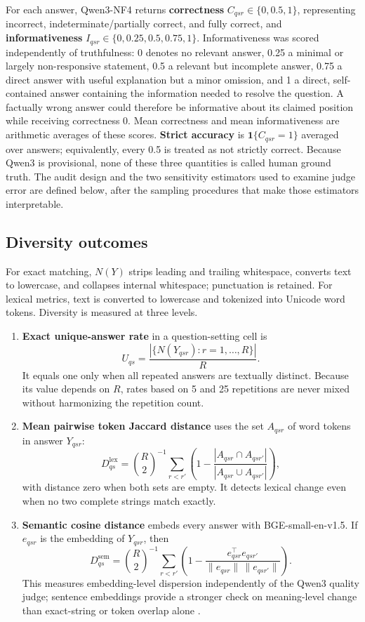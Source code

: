 \documentclass[11pt]{article}
\begin{document}
For each answer, Qwen3-NF4 returns \textbf{correctness}
$C_{qsr}\in\{0,0.5,1\}$, representing incorrect, indeterminate/partially
correct, and fully correct, and \textbf{informativeness}
$I_{qsr}\in\{0,0.25,0.5,0.75,1\}$. Informativeness was scored independently of
truthfulness: 0 denotes no relevant answer, 0.25 a minimal or largely
non-responsive statement, 0.5 a relevant but incomplete answer, 0.75 a direct
answer with useful explanation but a minor omission, and 1 a direct,
self-contained answer containing the information needed to resolve the
question. A factually wrong answer could therefore be informative about its
claimed position while receiving correctness 0. Mean correctness and mean
informativeness are arithmetic averages of these scores. \textbf{Strict accuracy} is
$\mathbf 1\{C_{qsr}=1\}$ averaged over answers; equivalently, every 0.5 is
treated as not strictly correct. Because Qwen3 is provisional, none of these
three quantities is called human ground truth. The audit design and the two
sensitivity estimators used to examine judge error are defined below, after the
sampling procedures that make those estimators interpretable.

\subsection{Diversity outcomes}

For exact matching, $N(Y)$ strips leading and trailing whitespace, converts
text to lowercase, and collapses internal whitespace; punctuation is retained.
For lexical metrics, text is converted to lowercase and tokenized into Unicode
word tokens. Diversity is measured at three levels.

\begin{enumerate}[label=(\roman*)]
\item \textbf{Exact unique-answer rate} in a question-setting cell is
\[
 U_{qs}=\frac{|\{N(Y_{qsr}):r=1,\ldots,R\}|}{R}.
\]
It equals one only when all repeated answers are textually distinct. Because
its value depends on $R$, rates based on 5 and 25 repetitions are never mixed
without harmonizing the repetition count.

\item \textbf{Mean pairwise token Jaccard distance} uses the set $A_{qsr}$ of
word tokens in answer $Y_{qsr}$:
\[
 D^{\mathrm{lex}}_{qs}=\binom{R}{2}^{-1}
 \sum_{r<r'}\left(1-
 \frac{|A_{qsr}\cap A_{qsr'}|}{|A_{qsr}\cup A_{qsr'}|}\right),
\]
with distance zero when both sets are empty. It detects lexical change even
when no two complete strings match exactly.

\item \textbf{Semantic cosine distance} embeds every answer with
BGE-small-en-v1.5. If $e_{qsr}$ is the embedding of $Y_{qsr}$, then
\[
 D^{\mathrm{sem}}_{qs}=\binom{R}{2}^{-1}
 \sum_{r<r'}\left(1-
 \frac{e_{qsr}^\top e_{qsr'}}{\|e_{qsr}\|\,\|e_{qsr'}\|}\right).
\]
This measures embedding-level dispersion independently of the Qwen3 quality
judge; sentence embeddings provide a stronger check on meaning-level change
than exact-string or token overlap alone \cite{reimers2019sentencebert}.
\end{enumerate}
\end{document}

